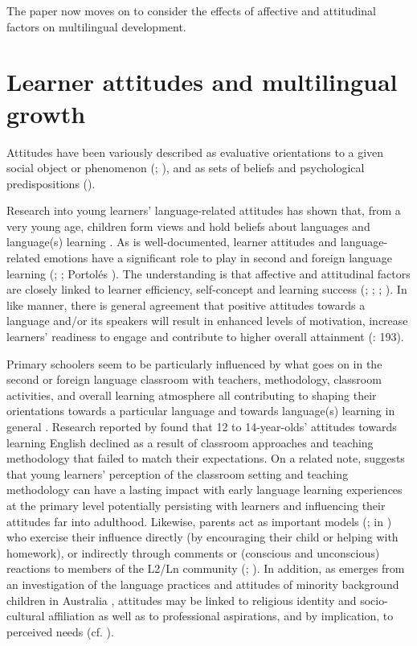 \documentclass[output=paper]{../langscibook}
\begin{document}
The paper now moves on to consider the effects of affective and attitudinal factors on multilingual development.

\section{Learner attitudes and multilingual growth}


Attitudes have been variously described as evaluative orientations to a given social object or phenomenon (\citealt{Garret2010}; \citealt{Cenoz2004}), and as sets of beliefs and psychological predispositions (\citealt[124]{TodorDegi2016}). 

Research into young learners’ language-related attitudes has shown that, from a very young age, children form views and hold beliefs about languages and language(s) learning \citep{Munoz2014,NagyNikolov2009,Nikolov2009}. As is well-documented, learner attitudes and language-related emotions have a significant role to play in second and foreign language learning (\citealt[3]{CourtneyEtAl2017}; \citealt[58]{Culhane2004}; Portolés \citealt[77]{Falomir2015}). The understanding is that affective and attitudinal factors are closely linked to learner efficiency, self-concept and learning success (\citealt{DornyeiEtAl2015}; \citealt[197]{MacIntyreGregersen2012}; \citealt{MacintyreEtAl2016}; \citealt{Wesely2012}). In like manner, there is general agreement that positive attitudes towards a language and/or its speakers will result in enhanced levels of motivation, increase learners’ readiness to engage and contribute to higher overall attainment (\citealt{MacIntyreGregersen2012}: 193).

Primary schoolers seem to be particularly influenced by what goes on in the second or foreign language classroom with teachers, methodology, classroom activities, and overall learning atmosphere all contributing to shaping their orientations towards a particular language and towards language(s) learning in general \citep{Nikolov1999}. Research reported by \citet[155]{Chambers1999} found that 12 to 14-year-olds’ attitudes towards learning English declined as a result of classroom approaches and teaching methodology that failed to match their expectations. On a related note, \citet[107]{Wesely2012} suggests that young learners’ perception of the classroom setting and teaching methodology can have a lasting impact with early language learning experiences at the primary level potentially persisting with learners and influencing their attitudes far into adulthood. Likewise, parents act as important models (\citealt[205]{Cenoz2004}; \citealt{Gardner1985} in \citealt{CsizerKormos2009}) who exercise their influence directly (by encouraging their child or helping with homework), or indirectly through comments or (conscious and unconscious) reactions to members of the L2/Ln community (\citealt[83]{CsizerKormos2009}; \citealt[347]{OtwinowskaDeAngelis2012}). In addition, as emerges from an investigation of the language practices and attitudes of minority background children in Australia \citep[64]{Bissoonauth2018}, attitudes may be linked to religious identity and socio-cultural affiliation as well as to professional aspirations, and by implication, to perceived needs (cf. \citealt{HerdinaJessner2002}).
\end{document}
